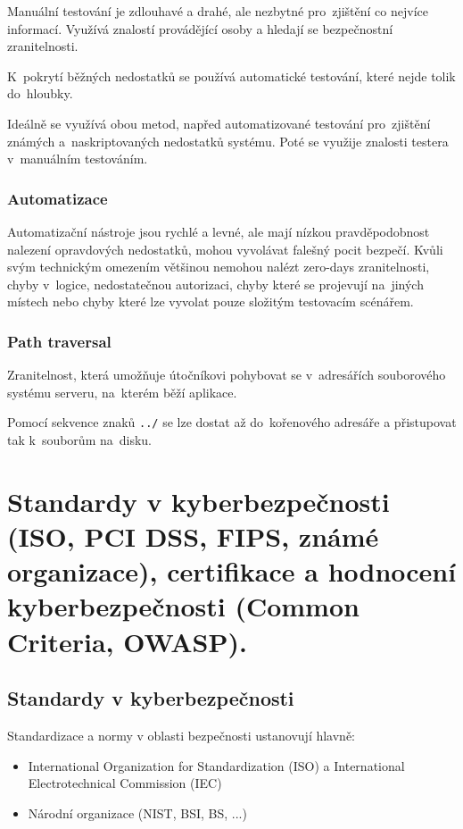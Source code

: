 Manuální testování je zdlouhavé a drahé, ale nezbytné pro~zjištění co nejvíce informací.
Využívá znalostí provádějící osoby a hledají se bezpečnostní zranitelnosti.

K~pokrytí běžných nedostatků se používá automatické testování, které nejde tolik do~hloubky.

Ideálně se využívá obou metod, napřed automatizované testování pro~zjištění známých a~naskriptovaných nedostatků systému.
Poté se využije znalosti testera v~manuálním testováním.

\subsubsection{Automatizace}

Automatizační nástroje jsou rychlé a levné, ale mají nízkou pravděpodobnost nalezení opravdových nedostatků, mohou vyvolávat falešný pocit bezpečí.
Kvůli svým technickým omezením většinou nemohou nalézt
zero-days zranitelnosti,
chyby v~logice,
nedostatečnou autorizaci,
chyby které se projevují na~jiných místech nebo
chyby které lze vyvolat pouze složitým testovacím scénářem.

\subsubsection{Path traversal}

Zranitelnost, která umožňuje útočníkovi pohybovat se v~adresářích souborového systému serveru, na~kterém běží aplikace.

Pomocí sekvence znaků \texttt{../} se lze dostat až do~kořenového adresáře a přistupovat tak k~souborům na~disku.


\clearpage
\section{Standardy v kyberbezpečnosti (ISO, PCI DSS, FIPS, známé organizace), certifikace a hodnocení kyberbezpečnosti (Common Criteria, OWASP).}

\subsection{Standardy v kyberbezpečnosti}
Standardizace a normy v oblasti bezpečnosti ustanovují hlavně:
\begin{itemize}
    \item International Organization for Standardization (ISO) a International Electrotechnical Commission (IEC)
    \item Národní organizace (NIST, BSI, BS, ...)
\end{itemize}

